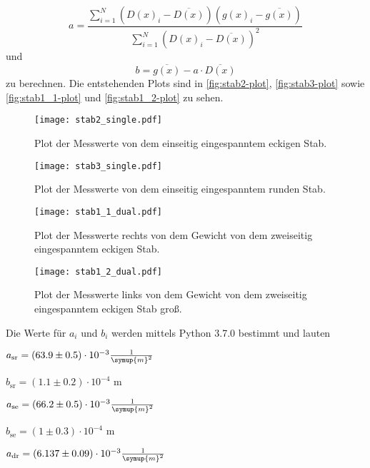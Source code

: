 

\begin{equation}
\label{eqn:a}
  a = \frac {\sum_{i=1}^N (D(x)_i - \overline{D(x)}) (g(x)_i - \overline{g(x)})}{\sum_{i=1}^N (D(x)_i - \overline{D(x)})^2}
\end{equation}
und
\begin{equation}
\label{eqn:b}
  b = \overline{g(x)} - a \cdot \overline{D(x)}
\end{equation}
zu berechnen.
Die entstehenden Plots sind in \autoref{fig:stab2-plot}, \autoref{fig:stab3-plot} sowie \autoref{fig:stab1_1-plot} und \autoref{fig:stab1_2-plot} zu sehen.

\begin{figure}
  \centering
  \texttt{[image: stab2\_single.pdf]}
  \caption{Plot der Messwerte von dem einseitig eingespanntem eckigen Stab.}
  \label{fig:stab2-plot}
\end{figure}

\begin{figure}
  \centering
  \texttt{[image: stab3\_single.pdf]}
  \caption{Plot der Messwerte von dem einseitig eingespanntem runden Stab.}
  \label{fig:stab3-plot}
\end{figure}

\begin{figure}
  \centering
  \texttt{[image: stab1\_1\_dual.pdf]}
  \caption{Plot der Messwerte rechts von dem Gewicht von dem zweiseitig eingespanntem eckigen Stab.}
  \label{fig:stab1_1-plot}
\end{figure}

\begin{figure}
  \centering
  \texttt{[image: stab1\_2\_dual.pdf]}
  \caption{Plot der Messwerte links von dem Gewicht von dem zweiseitig eingespanntem eckigen Stab groß.}
  \label{fig:stab1_2-plot}
\end{figure}

Die Werte für $a_i$ und $b_i$ werden mittels Python 3.7.0 bestimmt und lauten

\vspace{1em}
\centerline{$a_\text{sr} = (63.9 \pm 0.5) \cdot 10^{-3} \frac{1}{\symup{m}^2}$}

\centerline{$b_\text{sr} = (1.1 \pm 0.2) \cdot 10^{-4} $ m}
\vspace{1em}
\centerline{$a_\text{se} = (66.2 \pm 0.5) \cdot 10^{-3} \frac{1}{\symup{m}^2}$}

\centerline{$b_\text{se} = (1 \pm 0.3) \cdot 10^{-4} $ m}
\vspace{1em}
\centerline{$a_\text{dr} = (6.137 \pm 0.09) \cdot 10^{-3} \frac{1}{\symup{m}^2} $}


